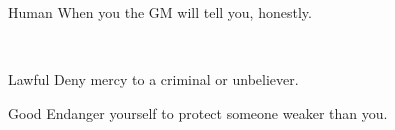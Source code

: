 \documentclass[8pt]{extarticle}
\begin{document}
\charbanner

\begin{minipage}[t]{3.2in}

\begin{optfeature}{Human}
  When you  the GM will tell you, honestly.
\end{optfeature}

\ 


\begin{optfeature}{Lawful}
  Deny mercy to a criminal or unbeliever.
\end{optfeature}

\begin{optfeature}{Good}
  Endanger yourself to protect someone weaker than you.
\end{optfeature}

\ 


\vfill\null
\end{minipage}
\end{document}
